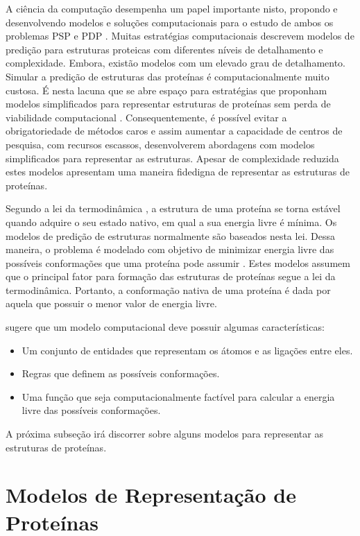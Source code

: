 A ciência da computação desempenha um papel importante nisto, propondo e desenvolvendo modelos e soluções computacionais para o estudo de ambos os problemas PSP e PDP \cite{lopes2008evolutionary}. Muitas estratégias computacionais descrevem modelos de predição para estruturas proteicas com diferentes níveis de detalhamento e complexidade. Embora, existão modelos com um elevado grau de detalhamento. Simular a predição de estruturas das proteínas é computacionalmente muito custosa. É nesta lacuna que se abre espaço para estratégias que proponham modelos simplificados para representar estruturas de proteínas sem perda de viabilidade computacional \cite{benitez2015algoritmo}. Consequentemente, é possível evitar a obrigatoriedade de métodos caros e assim aumentar a capacidade de centros de pesquisa, com recursos escassos, desenvolverem abordagens com modelos simplificados para representar as estruturas. Apesar de complexidade reduzida estes modelos apresentam uma maneira fidedigna de representar as estruturas de proteínas. 


Segundo a lei da termodinâmica \cite{anfinsen1972studies}, a estrutura de uma proteína se torna estável quando adquire o seu estado nativo, em qual a sua energia livre é mínima. Os modelos de predição de estruturas normalmente são baseados nesta lei. Dessa maneira, o problema é modelado com objetivo de minimizar energia livre das possíveis conformações que uma proteína pode assumir \cite{benitez2015algoritmo}. Estes modelos assumem que o principal fator para formação das estruturas de proteínas segue a lei da termodinâmica. Portanto, a conformação nativa de uma proteína é dada por aquela que possuir o menor valor de energia livre.

\cite{pedersen2000algorithms} sugere que um modelo computacional deve possuir algumas características:

\begin{itemize}
	\item Um conjunto de entidades que representam os átomos e as ligações entre eles. 
	\item Regras que definem as possíveis conformações.
	\item Uma função que seja computacionalmente factível para calcular a energia livre das possíveis conformações.
\end{itemize}

A próxima subseção irá discorrer sobre alguns modelos para representar as estruturas de proteínas.

\section{Modelos de Representação de Proteínas}

